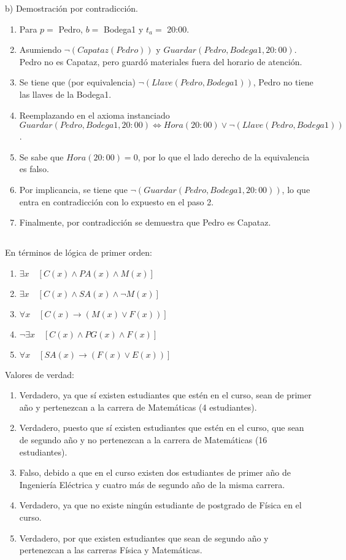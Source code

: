 \documentclass[11pt]{utalcaDoc}
\begin{document}
\begin{enumerate}
b) Demostración por contradicción.
\begin{enumerate}
\item Para $p = $ Pedro, $b = $ Bodega1 y $t_a = $ 20:00.
\item Asumiendo $\neg(Capataz(Pedro))$ y $Guardar(Pedro,Bodega1,20:00)$. Pedro no es Capataz, pero guardó materiales fuera del horario de atención.
\item Se tiene que (por equivalencia) $\neg (Llave(Pedro, Bodega1))$, Pedro no tiene las llaves de la Bodega1.
\item Reemplazando en el axioma instanciado \\ $Guardar(Pedro,Bodega1,20:00) \iff Hora(20:00) \lor \neg (Llave(Pedro, Bodega1)) $.
\item Se sabe que $Hora(20:00) = 0$, por lo que el lado derecho de la equivalencia es falso.
\item Por implicancia, se tiene que $\neg(Guardar(Pedro,Bodega1,20:00))$, lo que entra en contradicción con lo expuesto en el paso 2.
\item Finalmente, por contradicción se demuestra que Pedro es Capataz.
\end{enumerate}


\end{enumerate}

\newpage
\subsection{ } %
En términos de lógica de primer orden:
\begin{enumerate}
\item $\exists x \quad [C(x) \wedge PA(x) \wedge M(x)]$
\item $\exists x \quad [C(x) \wedge SA(x) \wedge \neg M(x)]$
\item $\forall x \quad [C(x) \to (M(x) \lor F(x))]$
\item $\neg \exists x \quad [C(x) \wedge PG(x) \wedge F(x)]$
\item $\forall x \quad [SA(x) \to (F(x) \lor E(x))]$
\end{enumerate} 

Valores de verdad:
\begin{enumerate}
\item Verdadero, ya que sí existen estudiantes que estén en el curso, sean de primer año y pertenezcan a la carrera de Matemáticas (4 estudiantes).
\item Verdadero, puesto que sí existen estudiantes que estén en el curso, que sean de segundo año y no pertenezcan a la carrera de Matemáticas (16 estudiantes).
\item Falso, debido a que en el curso existen dos estudiantes de primer año de Ingeniería Eléctrica y cuatro más de segundo año de la misma carrera.
\item Verdadero, ya que no existe ningún estudiante de postgrado de Física en el curso.
\item Verdadero, por que existen estudiantes que sean de segundo año y pertenezcan a las carreras Física y Matemáticas.
\end{enumerate}
 
\end{document}
